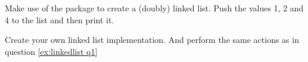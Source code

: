 \begin{Exercise}[title={Linked List},difficulty=1]
\label{ex:linkedlist}
\Question
\label{ex:linkedlist q1}
Make use of the package  to create
a (doubly) linked list. Push the values 1, 2 and 4 to the list and then
print it.

\Question
Create your own linked list implementation. And perform the same actions
as in question \ref{ex:linkedlist q1}
\end{Exercise}

\begin{Answer}
\Question

\Question
\end{Answer}
